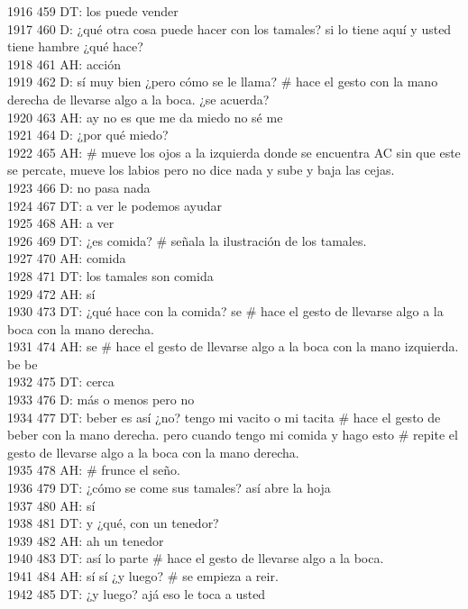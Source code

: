 1916 459 DT: los puede vender\\
1917 460 D: ¿qué otra cosa puede hacer con los tamales? si lo tiene aquí y usted tiene hambre ¿qué hace?\\
1918 461 AH: acción\\
1919 462 D: sí muy bien ¿pero cómo se le llama? # hace el gesto con la mano derecha de llevarse algo a la boca. ¿se acuerda? \\
1920 463 AH: ay no es que me da miedo no sé me \\
1921 464 D: ¿por qué miedo?\\
1922 465 AH: # mueve los ojos a la izquierda donde se encuentra AC sin que este se percate, mueve los labios pero no dice nada y sube y baja las cejas.\\
1923 466 D: no pasa nada\\
1924 467 DT: a ver le podemos ayudar\\
1925 468 AH: a ver\\
1926 469 DT: ¿es comida? # señala la ilustración de los tamales.\\
1927 470 AH: comida\\
1928 471 DT: los tamales son comida\\
1929 472 AH: sí\\
1930 473 DT: ¿qué hace con la comida? se # hace el gesto de llevarse algo a la boca con la mano derecha.\\
1931 474 AH: se # hace el gesto de llevarse algo a la boca con la mano izquierda. be be\\
1932 475 DT: cerca\\
1933 476 D: más o menos pero no\\
1934 477 DT: beber es así ¿no? tengo mi vacito o mi tacita # hace el gesto de beber con la mano derecha. pero cuando tengo mi comida y hago esto # repite el gesto de llevarse algo a la boca con la mano derecha.\\
1935 478 AH: # frunce el seño.\\
1936 479 DT: ¿cómo se come sus tamales? así abre la hoja\\
1937 480 AH: sí\\
1938 481 DT: y ¿qué, con un tenedor?\\
1939 482 AH: ah un tenedor\\
1940 483 DT: así lo parte # hace el gesto de llevarse algo a la boca.\\
1941 484 AH: sí sí ¿y luego? # se empieza a reir.\\
1942 485 DT: ¿y luego? ajá eso le toca a usted\\
